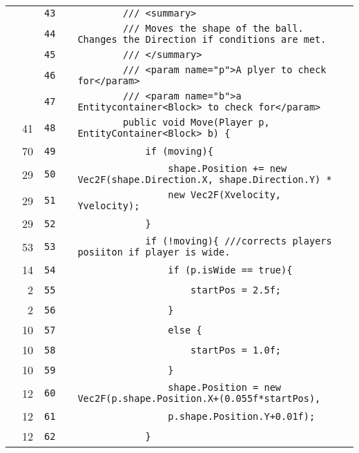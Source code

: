 \documentclass[a4paper,landscape,10pt]{article}
\begin{document}
\begin{longtable}[l]{lrrll}
\cellcolor{gray} &  & \verb~43~ & & \verb~        /// <summary>~\\
\cellcolor{gray} &  & \verb~44~ & & \verb~        /// Moves the shape of the ball. Changes the Direction if conditions are met.~\\
\cellcolor{gray} &  & \verb~45~ & & \verb~        /// </summary>~\\
\cellcolor{gray} &  & \verb~46~ & & \verb~        /// <param name="p">A plyer to check for</param>~\\
\cellcolor{gray} &  & \verb~47~ & & \verb~        /// <param name="b">a Entitycontainer<Block> to check for</param>~\\
\cellcolor{green} & 41 & \verb~48~ & & \verb~        public void Move(Player p, EntityContainer<Block> b) {~\\
\cellcolor{green} & 70 & \verb~49~ & & \verb~            if (moving){~\\
\cellcolor{green} & 29 & \verb~50~ & & \verb~                shape.Position += new Vec2F(shape.Direction.X, shape.Direction.Y) *~\\
\cellcolor{green} & 29 & \verb~51~ & & \verb~                new Vec2F(Xvelocity, Yvelocity);~\\
\cellcolor{green} & 29 & \verb~52~ & & \verb~            }~\\
\cellcolor{green} & 53 & \verb~53~ & & \verb~            if (!moving){ ///corrects players posiiton if player is wide.~\\
\cellcolor{green} & 14 & \verb~54~ & & \verb~                if (p.isWide == true){~\\
\cellcolor{green} & 2 & \verb~55~ & & \verb~                    startPos = 2.5f;~\\
\cellcolor{green} & 2 & \verb~56~ & & \verb~                }~\\
\cellcolor{green} & 10 & \verb~57~ & & \verb~                else {~\\
\cellcolor{green} & 10 & \verb~58~ & & \verb~                    startPos = 1.0f;~\\
\cellcolor{green} & 10 & \verb~59~ & & \verb~                }~\\
\cellcolor{green} & 12 & \verb~60~ & & \verb~                shape.Position = new Vec2F(p.shape.Position.X+(0.055f*startPos),~\\
\cellcolor{green} & 12 & \verb~61~ & & \verb~                p.shape.Position.Y+0.01f);~\\
\cellcolor{green} & 12 & \verb~62~ & & \verb~            }~\\

\end{longtable}
\end{document}
